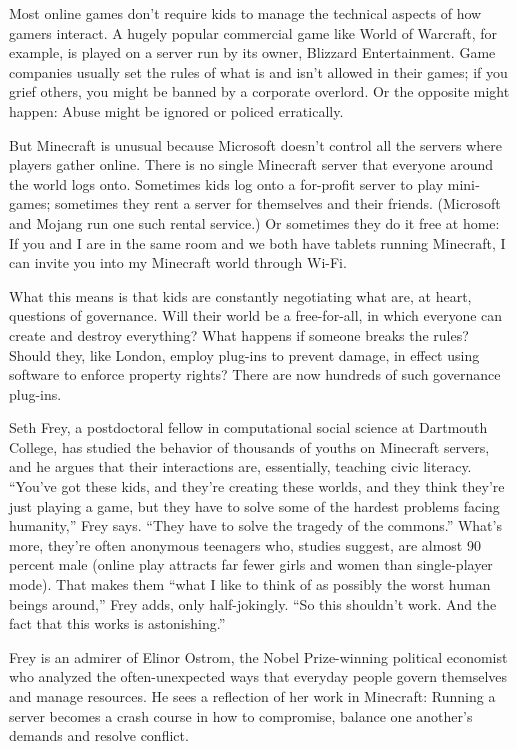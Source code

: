 Most online games don't require kids to manage the technical aspects of
how gamers interact. A hugely popular commercial game like World of
Warcraft, for example, is played on a server run by its owner, Blizzard
Entertainment. Game companies usually set the rules of what is and isn't
allowed in their games; if you grief others, you might be banned by a
corporate overlord. Or the opposite might happen: Abuse might be ignored
or policed erratically.

But Minecraft is unusual because Microsoft doesn't control all the
servers where players gather online. There is no single Minecraft server
that everyone around the world logs onto. Sometimes kids log onto a
for-­profit server to play mini­games; sometimes they rent a server for
themselves and their friends. (Microsoft and Mojang run one such rental
service.) Or sometimes they do it free at home: If you and I are in the
same room and we both have tablets running Minecraft, I can invite you
into my Minecraft world through Wi-Fi.

What this means is that kids are constantly negotiating what are, at
heart, questions of governance. Will their world be a free-for-all, in
which everyone can create and destroy everything? What happens if
someone breaks the rules? Should they, like London, employ plug-ins to
prevent damage, in effect using software to enforce property rights?
There are now hundreds of such governance plug-ins.

Seth Frey, a postdoctoral fellow in computational social science at
Dartmouth College, has studied the behavior of thousands of youths on
Minecraft servers, and he argues that their interactions are,
essentially, teaching civic literacy. ``You've got these kids, and
they're creating these worlds, and they think they're just playing a
game, but they have to solve some of the hardest problems facing
humanity,'' Frey says. ``They have to solve the tragedy of the
commons.'' What's more, they're often anonymous teenagers who, studies
suggest, are almost 90 percent male (online play attracts far fewer
girls and women than single-­player mode). That makes them ``what I like
to think of as possibly the worst human beings around,'' Frey adds, only
half-­jokingly. ``So this shouldn't work. And the fact that this works
is astonishing.''

Frey is an admirer of Elinor Ostrom, the Nobel Prize-­winning political
economist who analyzed the often-­unexpected ways that everyday people
govern themselves and manage resources. He sees a reflection of her work
in Minecraft: Running a server becomes a crash course in how to
compromise, balance one another's demands and resolve conflict.

